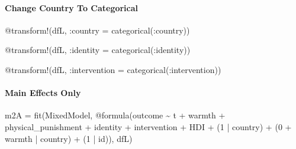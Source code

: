 \documentclass[
  letterpaper,
  DIV=11,
  numbers=noendperiod]{scrreprt}
\let\oldparagraph\paragraph
\renewcommand{\paragraph}[1]{\oldparagraph{#1}\mbox{}}
\newenvironment{Shaded}{\begin{snugshade}}{\end{snugshade}}
\newcommand{\FloatTok}[1]{\textcolor[rgb]{0.68,0.00,0.00}{#1}}
\newcommand{\FunctionTok}[1]{\textcolor[rgb]{0.28,0.35,0.67}{#1}}
\newcommand{\NormalTok}[1]{\textcolor[rgb]{0.00,0.23,0.31}{#1}}
\newcommand{\OperatorTok}[1]{\textcolor[rgb]{0.37,0.37,0.37}{#1}}
\newcommand{\PreprocessorTok}[1]{\textcolor[rgb]{0.68,0.00,0.00}{#1}}
\begin{document}
\paragraph{Change Country To
Categorical}\label{change-country-to-categorical}

\begin{Shaded}
\begin{Highlighting}[]
\PreprocessorTok{@transform}\NormalTok{!(dfL, }\OperatorTok{:}\NormalTok{country }\OperatorTok{=} \FunctionTok{categorical}\NormalTok{(}\OperatorTok{:}\NormalTok{country))}

\PreprocessorTok{@transform}\NormalTok{!(dfL, }\OperatorTok{:}\NormalTok{identity }\OperatorTok{=} \FunctionTok{categorical}\NormalTok{(}\OperatorTok{:}\NormalTok{identity))}

\PreprocessorTok{@transform}\NormalTok{!(dfL, }\OperatorTok{:}\NormalTok{intervention }\OperatorTok{=} \FunctionTok{categorical}\NormalTok{(}\OperatorTok{:}\NormalTok{intervention))}
\end{Highlighting}
\end{Shaded}

\paragraph{Main Effects Only}\label{main-effects-only-2}

\begin{Shaded}
\begin{Highlighting}[]
\NormalTok{m2A }\OperatorTok{=} \FunctionTok{fit}\NormalTok{(MixedModel, }\PreprocessorTok{@formula}\NormalTok{(outcome }\OperatorTok{\textasciitilde{}}\NormalTok{ t }\OperatorTok{+}\NormalTok{ warmth }\OperatorTok{+} 
\NormalTok{                                 physical\_punishment }\OperatorTok{+} 
\NormalTok{                                 identity }\OperatorTok{+}\NormalTok{ intervention }\OperatorTok{+} 
\NormalTok{                                 HDI }\OperatorTok{+}
\NormalTok{                                 (}\FloatTok{1} \OperatorTok{|}\NormalTok{ country) }\OperatorTok{+} 
\NormalTok{                                 (}\FloatTok{0} \OperatorTok{+}\NormalTok{ warmth }\OperatorTok{|}\NormalTok{ country) }\OperatorTok{+}
\NormalTok{                                 (}\FloatTok{1} \OperatorTok{|}\NormalTok{ id)), dfL)}
\end{Highlighting}
\end{Shaded}
\end{document}
